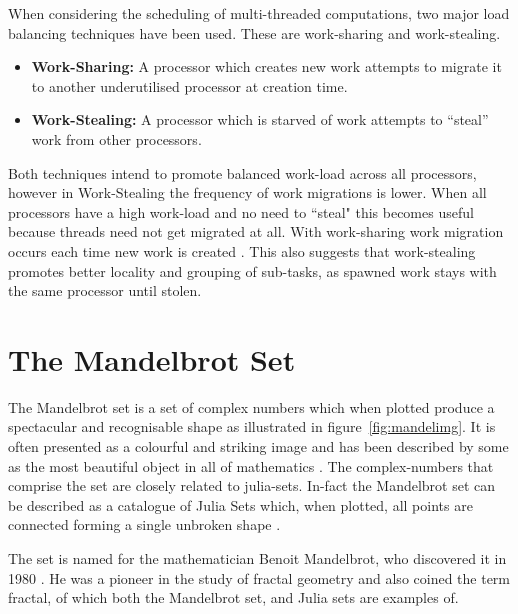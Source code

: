 When considering the scheduling of multi-threaded computations, two major load balancing techniques have been used.
These are \gls{work-sharing} and \gls{work-stealing}.

\begin{itemize}
\item \textbf{Work-Sharing:} A processor which creates new work attempts to migrate it to another underutilised processor at creation time. 
\item \textbf{Work-Stealing:} A processor which is starved of work attempts to ``steal'' work from other processors. 
\end{itemize}

Both techniques intend to promote balanced work-load across all processors, however in Work-Stealing
the frequency of work migrations is lower. When all processors have a 
high work-load and no need to ``steal" this becomes useful because threads need not get 
migrated at all. With \gls{work-sharing} work migration occurs each time new work is created \cite{blumleis}.
This also suggests that work-stealing promotes better \gls{locality} and grouping of sub-tasks, as spawned work 
stays with the same processor until stolen.

\section{The Mandelbrot Set}

The Mandelbrot set is a set of complex numbers which when plotted produce a spectacular and recognisable shape as illustrated in figure~\ref{fig:mandelimg}.
It is often presented as a colourful and striking image and has been described by some as the most beautiful object in all of mathematics 
\cite[p.~234]{chaosfract}.
The \glspl{complex-number} that comprise the set are closely related to julia-sets. 
In-fact the Mandelbrot set can be described as a catalogue of Julia Sets which, when plotted, all points are connected 
forming a single unbroken shape \cite[p.~177]{fractimg}.

The set is named for the mathematician Benoit Mandelbrot, who discovered it in 1980 \cite{fracnature , fractimg}. He was a pioneer in the study of 
fractal geometry and also coined the term \gls{fractal}, of which both the Mandelbrot set, and Julia sets are examples of. 

